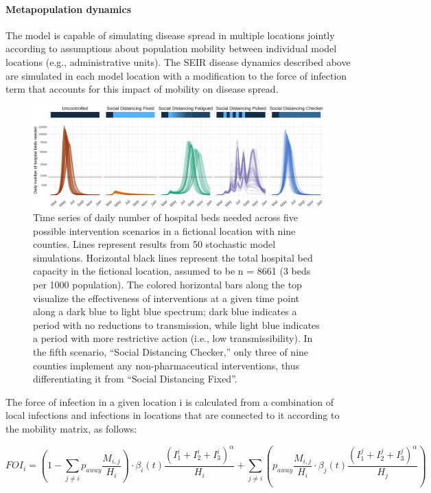 \paragraph{Metapopulation dynamics}
The model is capable of simulating disease spread in multiple locations jointly according to assumptions about population mobility between individual model locations (e.g., administrative units). The SEIR disease dynamics described above are simulated in each model location with a modification to the force of infection term that accounts for this impact of mobility on disease spread.

\begin{figure}[!htb]%
    \centering
    \includegraphics{fig_pipeline/fig2a}
    \caption[Time series of daily number of hospital beds needed across scenarios.]{Time series of daily number of hospital beds needed across five possible intervention scenarios in a fictional location with nine counties. Lines represent results from 50 stochastic model simulations. Horizontal black lines represent the total hospital bed capacity in the fictional location, assumed to be n = 8661 (3 beds per 1000 population). The colored horizontal bars along the top visualize the effectiveness of interventions at a given time point along a dark blue to light blue spectrum; dark blue indicates a period with no reductions to transmission, while light blue indicates a period with more restrictive action (i.e., low transmissibility). In the fifth scenario, “Social Distancing Checker,” only three of nine counties implement any non-pharmaceutical interventions, thus differentiating it from “Social Distancing Fixed”.}
    \label{fig:pipeline-seir}
\end{figure}

The force of infection in a given location i is calculated from a combination of local infections and infections in locations that are connected to it according to the mobility matrix, as follows:
\begin{fullwidth}
\begin{equation}
FOI_i = \left(1 - \sum_{j\neq i} p_{away} \frac{M_{i,j}}{H_i} \right) \cdot \beta_i(t) \frac{(I_1^{i} + I_2^{i} + I_3^{i})^\alpha}{H_i} +  \sum_{j \neq i} \left(p_{away} \frac{M_{i,j}}{H_i} \cdot \beta_j(t) \frac{(I_1^j + I_2^j + I_3^j)^\alpha}{H_j} \right)
\end{equation}
\end{fullwidth}

